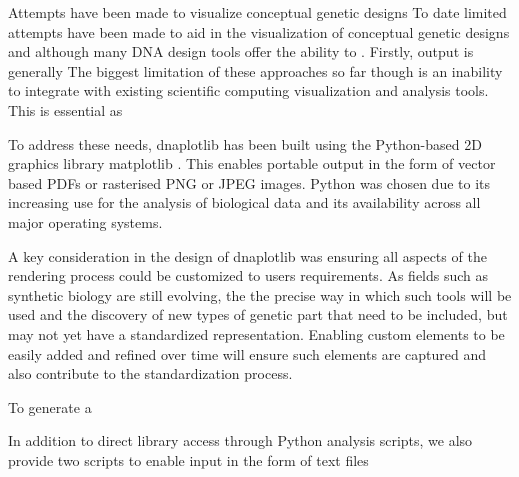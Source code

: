 \documentclass{bioinfo}
\begin{document}

Attempts have been made to visualize conceptual genetic designs 
To date limited attempts have been made to aid in the visualization of conceptual genetic designs \citep{Bhatia13a} and although many DNA design tools offer the ability to . Firstly, output is generally 
The biggest limitation of these approaches so far though is an inability to integrate with existing scientific computing visualization and analysis tools. This is essential as 








To address these needs, dnaplotlib has been built using the Python-based 2D graphics library matplotlib \citep{Hunter07a}. This enables portable output in the form of vector based PDFs or rasterised PNG or JPEG images. Python was chosen due to its increasing use for the analysis of biological data \citep{Cock09a} and its availability across all major operating systems.

A key consideration in the design of dnaplotlib was ensuring all aspects of the rendering process could be customized to users requirements. As fields such as synthetic biology are still evolving, the the precise way in which such tools will be used and the discovery of new types of genetic part that need to be included, but may not yet have a standardized representation. Enabling custom elements to be easily added and refined over time will ensure such elements are captured and also contribute to the standardization process. 

To generate a 

In addition to direct library access through Python analysis scripts, we also provide two scripts to enable input in the form of text files

\end{document}
